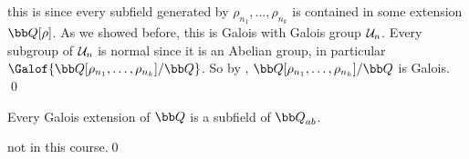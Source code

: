 \ecoro

\Proof this is since every subfield generated by $\rho_{n_1},\dots,\rho_{n_k}$ is contained in some extension ${\bb Q}[\rho]$.
As we showed before, this is Galois with Galois group ${\cal U}_n$.
Every subgroup of ${\cal U}_n$ is normal since it is an Abelian group, in particular $\Galof{{\bb Q}[\rho_{n_1},\dots,\rho_{n_k}]/{\bb Q}}$.
So by , ${\bb Q}[\rho_{n_1},\dots,\rho_{n_k}]/{\bb Q}$ is Galois.
\qed

\bthrm[title=Kronecker-Weber Theorem]

    Every Galois extension of ${\bb Q}$ is a subfield of ${\bb Q}_{ab}$.

\ethrm

\Proof not in this course.\qed

